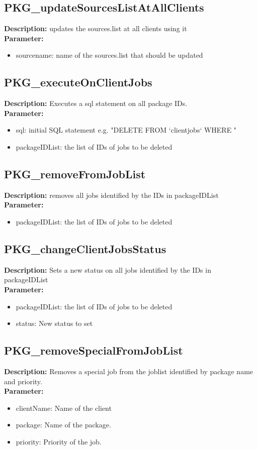 \subsection{PKG\_updateSourcesListAtAllClients}
\textbf{Description:} updates the sources.list at all clients using it\\
\textbf{Parameter:}
\begin{itemize}
\item sourcename: name of the sources.list that should be updated
\end{itemize}

\subsection{PKG\_executeOnClientJobs}
\textbf{Description:} Executes a sql statement on all package IDs.\\
\textbf{Parameter:}
\begin{itemize}
\item sql: initial SQL statement e.g. "DELETE FROM `clientjobs` WHERE "
\item packageIDList: the list of IDs of jobs to be deleted
\end{itemize}

\subsection{PKG\_removeFromJobList}
\textbf{Description:} removes all jobs identified by the IDs in packageIDList\\
\textbf{Parameter:}
\begin{itemize}
\item packageIDList: the list of IDs of jobs to be deleted
\end{itemize}

\subsection{PKG\_changeClientJobsStatus}
\textbf{Description:} Sets a new status on all jobs identified by the IDs in packageIDList\\
\textbf{Parameter:}
\begin{itemize}
\item packageIDList: the list of IDs of jobs to be deleted
\item status: New status to set
\end{itemize}

\subsection{PKG\_removeSpecialFromJobList}
\textbf{Description:} Removes a special job from the joblist identified by package name and priority.\\
\textbf{Parameter:}
\begin{itemize}
\item clientName: Name of the client
\item package: Name of the package.
\item priority: Priority of the job.
\end{itemize}

